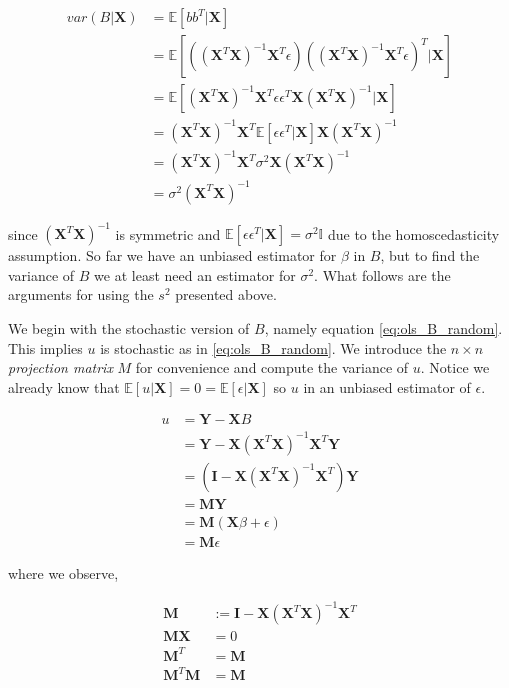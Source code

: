 \begin{align*}
var(B | \mathbf{X}) &= \mathbb{E}[bb^T | \mathbf{X}]\\
&= \mathbb{E}[((\mathbf{X}^T\mathbf{X})^{-1}\mathbf{X}^T\epsilon)((\mathbf{X}^T\mathbf{X})^{-1}\mathbf{X}^T\epsilon)^T | \mathbf{X}]\\
&= \mathbb{E}[(\mathbf{X}^T\mathbf{X})^{-1}\mathbf{X}^T\epsilon \epsilon^T\mathbf{X}(\mathbf{X}^T\mathbf{X})^{-1} | \mathbf{X}]\\
&= (\mathbf{X}^T\mathbf{X})^{-1}\mathbf{X}^T\mathbb{E}[\epsilon \epsilon^T | \mathbf{X}]\mathbf{X}(\mathbf{X}^T\mathbf{X})^{-1}\\
&= (\mathbf{X}^T\mathbf{X})^{-1}\mathbf{X}^T\sigma^2\mathbf{X}(\mathbf{X}^T\mathbf{X})^{-1}\\
&= \sigma^2(\mathbf{X}^T\mathbf{X})^{-1}
\end{align*}

since $(\mathbf{X}^T\mathbf{X})^{-1}$ is symmetric and $\mathbb{E}[\epsilon\epsilon^T | \mathbf{X}] = \sigma^2\mathbb{I}$ due to the homoscedasticity assumption. So far we have an unbiased estimator for $\beta$ in $B$, but to find the variance of $B$ we at least need an estimator for $\sigma^2$. What follows are the arguments for using the $s^2$ presented above.

We begin with the stochastic version of $B$, namely equation \ref{eq:ols_B_random}. This implies $u$ is stochastic as in \ref{eq:ols_B_random}. We introduce the $n \times n$ \emph{projection matrix} $M$ for convenience and compute the variance of $u$. Notice we already know that $\mathbb{E}[u | \mathbf{X}] = 0 = \mathbb{E}[\epsilon | \mathbf{X}]$ so $u$ in an unbiased estimator of $\epsilon$.

\begin{align*}
\label{eq:ols_u_random}u &= \mathbf{Y} - \mathbf{X}B\\
&= \mathbf{Y} - \mathbf{X}(\mathbf{X}^T\mathbf{X})^{-1}\mathbf{X}^T\mathbf{Y}\\
&= \left(\mathbf{I} - \mathbf{X}(\mathbf{X}^T\mathbf{X})^{-1}\mathbf{X}^T\right)\mathbf{Y}\\
&= \mathbf{M}\mathbf{Y}\\
&= \mathbf{M}(\mathbf{X}\beta + \epsilon)\\
&= \mathbf{M}\epsilon
\end{align*}

where we observe,

\begin{align*}
\mathbf{M} &:= \mathbf{I} - \mathbf{X}(\mathbf{X}^T\mathbf{X})^{-1}\mathbf{X}^T\\
\mathbf{M}\mathbf{X} &= 0\\
\mathbf{M}^T &= \mathbf{M}\\
\mathbf{M}^T\mathbf{M} &= \mathbf{M}
\end{align*}

